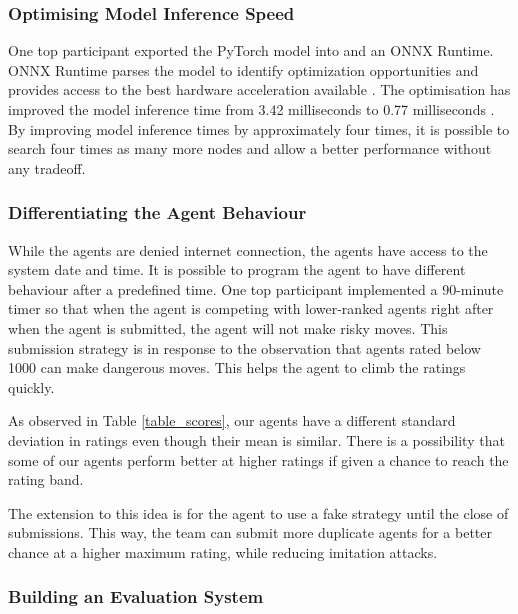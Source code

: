 \subsubsection{Optimising Model Inference Speed}
\label{subsubsection_speedup}

One top participant \cite{sharing_robga} exported the PyTorch model into and an ONNX Runtime. ONNX Runtime parses the model to identify optimization opportunities and provides access to the best hardware acceleration available \cite{website_onnx}. The optimisation has improved the model inference time from 3.42 milliseconds to 0.77 milliseconds \cite{sharing_robga}. By improving model inference times by approximately four times, it is possible to search four times as many more nodes and allow a better performance without any tradeoff.

\subsubsection{Differentiating the Agent Behaviour}
\label{subsubsection_time_diff}

While the agents are denied internet connection, the agents have access to the system date and time. It is possible to program the agent to have different behaviour after a predefined time. 
One top participant \cite{sharing_robga} implemented a 90-minute timer so that when the agent is competing with lower-ranked agents right after when the agent is submitted, the agent will not make risky moves. This submission strategy is in response to the observation that agents rated below 1000 can make dangerous moves. This helps the agent to climb the ratings quickly.

As observed in Table \ref{table_scores}, our agents have a different standard deviation in ratings even though their mean is similar. There is a possibility that some of our agents perform better at higher ratings if given a chance to reach the rating band.

The extension to this idea is for the agent to use a fake strategy until the close of submissions. This way, the team can submit more duplicate agents for a better chance at a higher maximum rating, while reducing imitation attacks.

\subsubsection{Building an Evaluation System}
\label{subsubsection_eval}

